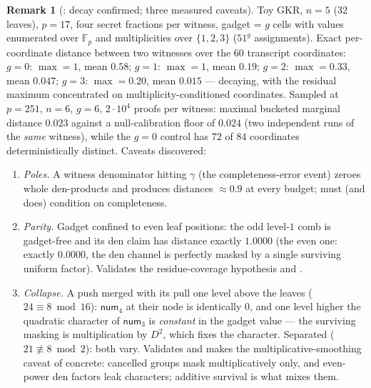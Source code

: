 \documentclass{article}
\newcommand{\Fp}{\mathbb{F}_p}
\newcommand{\num}{\mathsf{num}}
\theoremstyle{definition}
\newtheorem{remark}[theorem]{Remark}
\begin{document}
\begin{remark}[: decay confirmed; three measured caveats]\label{rem:numB}
Toy GKR, $n = 5$ ($32$ leaves), $p = 17$, four secret fractions per witness, gadget = $g$ cells with values enumerated over $\Fp$ and multiplicities over $\{1,2,3\}$ ($51^g$ assignments). Exact per-coordinate distance between two witnesses over the $60$ transcript coordinates: $g = 0$: $\max = 1$, mean $0.58$; $g = 1$: $\max = 1$, mean $0.19$; $g = 2$: $\max = 0.33$, mean $0.047$; $g = 3$: $\max = 0.20$, mean $0.015$ --- decaying, with the residual maximum concentrated on multiplicity-conditioned coordinates. Sampled at $p = 251$, $n = 6$, $g = 6$, $2 \cdot 10^4$ proofs per witness: maximal bucketed marginal distance $0.023$ against a null-calibration floor of $0.024$ (two independent runs of the \emph{same} witness), while the $g = 0$ control has $72$ of $84$ coordinates deterministically distinct. Caveats discovered:
\begin{enumerate}
    \item \emph{Poles.} A witness denominator hitting $\gamma$ (the completeness-error event) zeroes whole den-products and produces distances $\approx 0.9$ at every budget;  must (and does) condition on completeness.
    \item \emph{Parity.} Gadget confined to even leaf positions: the odd level-$1$ comb is gadget-free and its den claim has distance exactly $1.0000$ (the even one: exactly $0.0000$, the den channel is perfectly masked by a single surviving uniform factor). Validates the residue-coverage hypothesis and .
    \item \emph{Collapse.} A push merged with its pull one level above the leaves ($24 \equiv 8 \bmod 16$): $\num_4$ at their node is identically $0$, and one level higher the quadratic character of $\num_3$ is \emph{constant} in the gadget value --- the surviving masking is multiplication by $D^2$, which fixes the character. Separated ($21 \not\equiv 8 \bmod 2$): both vary. Validates  and makes the multiplicative-smoothing caveat of  concrete: cancelled groups mask multiplicatively only, and even-power den factors leak characters; additive survival is what mixes them.
\end{enumerate}
\end{remark}
\end{document}
